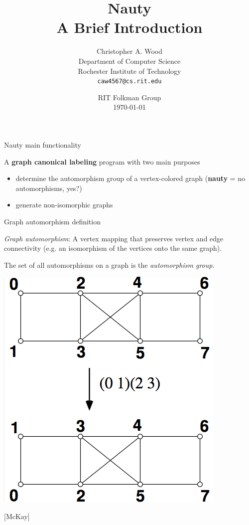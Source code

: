 \documentclass{beamer}
\title
{Nauty \\
A Brief Introduction}
\author[caw rit]
{Christopher A. Wood\\
{\small Department of Computer Science}\\
{\small Rochester Institute of Technology}\\
{\small\tt caw4567@cs.rit.edu}}
\date[CSC 2010] %
{RIT Folkman Group\\ \today}
\begin{document}
\begin{frame}
  \titlepage
\end{frame}


\begin{frame}{Nauty}
{main functionality}

A \textbf{graph canonical labeling} program with two main purposes

\bigskip
\begin{itemize}
\item
determine the automorphism group of a vertex-colored graph (\textbf{nauty} = no automorphisms, yes?)
\item
generate non-isomorphic graphs
\end{itemize}

\end{frame}


\begin{frame}{Graph automorphism}
{definition}

\emph{Graph automorphism}: A vertex mapping that preserves vertex and edge
connectivity (e.g. an isomorphism of the vertices onto the same graph).

\medskip

The set of all automorphisms on a graph is the \emph{automorphism group}.

\medskip

\begin{center}
\includegraphics[scale=0.3]{automorphism.png} 
\end{center}
{\small [McKay]}

\end{frame}
\end{document}
